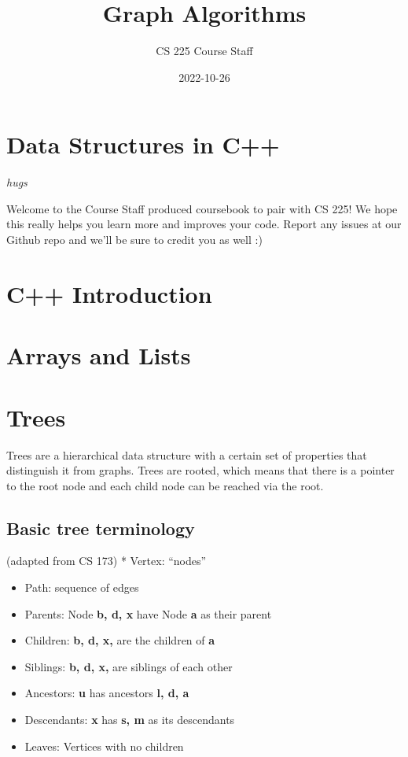 \documentclass[
]{book}
\title{Graph Algorithms}
\author{CS 225 Course Staff}
\date{2022-10-26}
\begin{document}
\maketitle

{
\setcounter{tocdepth}{2}
\tableofcontents
}
\hypertarget{data-structures-in-c}{%
\chapter{Data Structures in C++}\label{data-structures-in-c}}

\emph{hugs}

Welcome to the Course Staff produced coursebook to pair with CS 225! We hope this really helps you learn more and improves your code. Report any issues at our Github repo and we'll be sure to credit you as well :)

\hypertarget{c-introduction}{%
\chapter{C++ Introduction}\label{c-introduction}}

\hypertarget{arrays-and-lists}{%
\chapter{Arrays and Lists}\label{arrays-and-lists}}

\hypertarget{trees}{%
\chapter{Trees}\label{trees}}

Trees are a hierarchical data structure with a certain set of properties that distinguish it from graphs. Trees are rooted, which means that there is a pointer to the root node and each child node can be reached via the root.

\hypertarget{basic-tree-terminology}{%
\section{Basic tree terminology}\label{basic-tree-terminology}}

(adapted from CS 173)
* Vertex: ``nodes''

\begin{itemize}
\item
  Path: sequence of edges
\item
  Parents: Node \textbf{b, d, x} have Node \textbf{a} as their parent
\item
  Children: \textbf{b, d, x,} are the children of \textbf{a}
\item
  Siblings: \textbf{b, d, x,} are siblings of each other
\item
  Ancestors: \textbf{u} has ancestors \textbf{l, d, a}
\item
  Descendants: \textbf{x} has \textbf{s, m} as its descendants
\item
  Leaves: Vertices with no children
\end{itemize}
\end{document}
